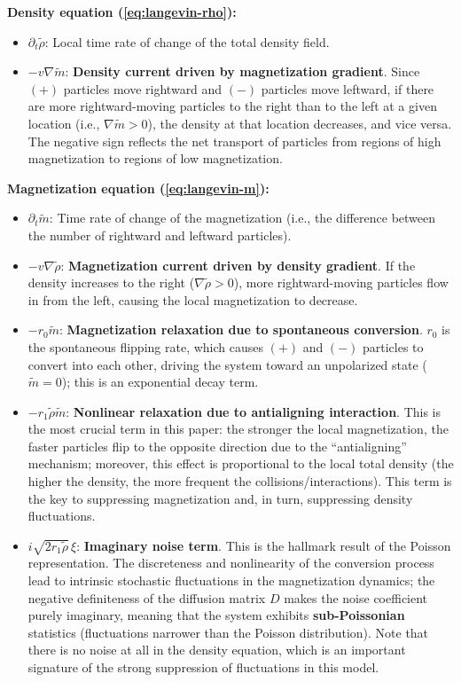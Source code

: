 \begin{remark}
\textbf{Density equation (\ref{eq:langevin-rho}):}
\begin{itemize}
    \item $\partial_t \tilde{\rho}$: Local time rate of change of the total density field.
    \item $-v\nabla\tilde{m}$: \textbf{Density current driven by magnetization gradient}. Since $(+)$ particles move rightward and $(-)$ particles move leftward, if there are more rightward-moving particles to the right than to the left at a given location (i.e., $\nabla\tilde{m}>0$), the density at that location decreases, and vice versa. The negative sign reflects the net transport of particles from regions of high magnetization to regions of low magnetization.
\end{itemize}

\textbf{Magnetization equation (\ref{eq:langevin-m}):}
\begin{itemize}
    \item $\partial_t \tilde{m}$: Time rate of change of the magnetization (i.e., the difference between the number of rightward and leftward particles).
    \item $-v\nabla\tilde{\rho}$: \textbf{Magnetization current driven by density gradient}. If the density increases to the right ($\nabla\tilde{\rho}>0$), more rightward-moving particles flow in from the left, causing the local magnetization to decrease.
    \item $-r_0\tilde{m}$: \textbf{Magnetization relaxation due to spontaneous conversion}. $r_0$ is the spontaneous flipping rate, which causes $(+)$ and $(-)$ particles to convert into each other, driving the system toward an unpolarized state ($\tilde{m}=0$); this is an exponential decay term.
    \item $-r_1\tilde{\rho}\tilde{m}$: \textbf{Nonlinear relaxation due to antialigning interaction}. This is the most crucial term in this paper: the stronger the local magnetization, the faster particles flip to the opposite direction due to the ``antialigning'' mechanism; moreover, this effect is proportional to the local total density (the higher the density, the more frequent the collisions/interactions). This term is the key to suppressing magnetization and, in turn, suppressing density fluctuations.
    \item $i\sqrt{2r_1\tilde{\rho}}\,\xi$: \textbf{Imaginary noise term}. This is the hallmark result of the Poisson representation. The discreteness and nonlinearity of the conversion process lead to intrinsic stochastic fluctuations in the magnetization dynamics; the negative definiteness of the diffusion matrix $D$ makes the noise coefficient purely imaginary, meaning that the system exhibits \textbf{sub-Poissonian} statistics (fluctuations narrower than the Poisson distribution). Note that there is no noise at all in the density equation, which is an important signature of the strong suppression of fluctuations in this model.
\end{itemize}
\end{remark}

